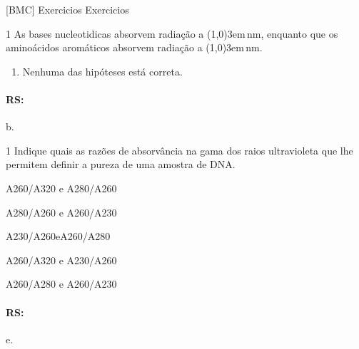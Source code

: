 \documentclass[\mainfilename]{subfiles}
\begin{document}
[BMC]
{Exercicios}
{Exercicios}


\begin{questionBox}1{ %
    As bases nucleotidicas absorvem radiação a \line(1,0){3em}\,\unit{\nano\metre}, enquanto que os aminoácidos aromáticos absorvem radiação a \line(1,0){3em}\,\unit{\nano\metre}.
} %
    
    \begin{enumerate}[label=\alph{enumi}.]
        \item Nenhuma das hipóteses está correta.
    \end{enumerate}

    \paragraph*{RS:} b.

\end{questionBox}

\begin{questionBox}1{ %
    Indique quais as razões de absorvância na gama dos raios ultravioleta que lhe permitem definir a pureza de uma amostra de DNA.
} %

    \begin{enumerate}[label=\alph{enumi}.]
        \begin{multicols}{2}
            \item A260/A320 e A280/A260 
            \item A280/A260 e A260/A230 
            \item A230/A260eA260/A280 
            \item A260/A320 e A230/A260 
            \item A260/A280 e A260/A230
        \end{multicols}
    \end{enumerate}

    \paragraph*{RS:} e.

\end{questionBox}
\end{document}
